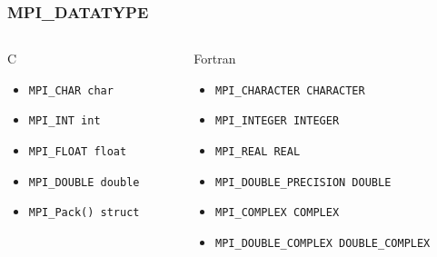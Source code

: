 \documentclass{beamer}
\begin{document}
\begin{frame}[fragile]
 \frametitle{MPI\_DATATYPE}
  \begin{columns}[T]
   \begin{column}{5cm}
    \begin{block}{C}
     \begin{itemize}
      \item \texttt{MPI\_CHAR char}
      \item \texttt{MPI\_INT int}
      \item \texttt{MPI\_FLOAT float}
      \item \texttt{MPI\_DOUBLE double}
      \item \texttt{MPI\_Pack() struct}
     \end{itemize}
    \end{block}
   \end{column}
   \begin{column}{5cm}
    \begin{block}{Fortran}
     \begin{itemize}
      \item \texttt{MPI\_CHARACTER CHARACTER}
      \item \texttt{MPI\_INTEGER INTEGER}
      \item \texttt{MPI\_REAL REAL}
      \item \texttt{MPI\_DOUBLE\_PRECISION DOUBLE}
      \item \texttt{MPI\_COMPLEX COMPLEX}
      \item \texttt{MPI\_DOUBLE\_COMPLEX DOUBLE\_COMPLEX}
     \end{itemize}
    \end{block}
   \end{column}
  \end{columns}
\end{frame}
\end{document}
